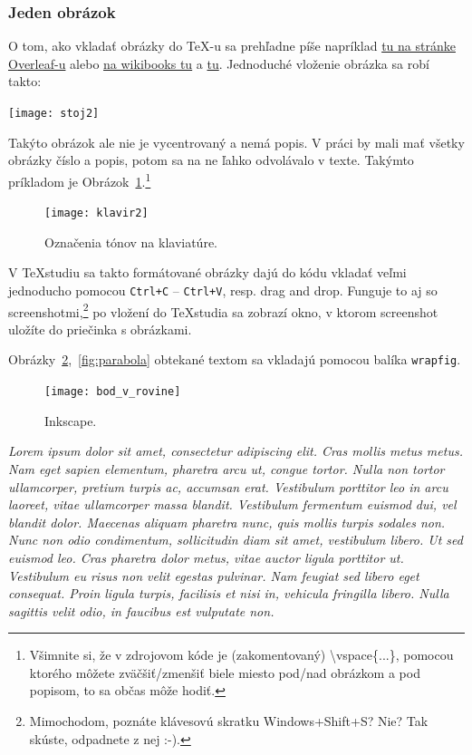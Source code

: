 \subsubsection{Jeden obrázok}
O tom, ako vkladať obrázky do TeX-u sa prehľadne píše napríklad \href{https://www.overleaf.com/learn/latex/Inserting_Images}{tu na stránke Overleaf-u} alebo \href{https://en.wikibooks.org/wiki/LaTeX/Importing_Graphics}{na wikibooks tu} a \href{https://en.wikibooks.org/wiki/LaTeX/Floats,_Figures_and_Captions}{tu}. Jednoduché vloženie obrázka sa robí takto:

\texttt{[image: stoj2]}

Takýto obrázok ale nie je vycentrovaný a nemá popis. V práci by mali mať všetky obrázky číslo a popis, potom sa na ne ľahko odvolávalo v texte. Takýmto príkladom je Obrázok~\ref{fig:klavir}.\footnote{Všimnite si, že v zdrojovom kóde je (zakomentovaný) \textbackslash vspace\{...\}, pomocou ktorého môžete zväčšiť/zmenšiť biele miesto pod/nad obrázkom a pod popisom, to sa občas môže hodiť.}

\begin{figure}[h]
	\centering
	\texttt{[image: klavir2]}
	\caption{Označenia tónov na klaviatúre.}
	\label{fig:klavir}
\end{figure}

V TeXstudiu sa takto formátované obrázky dajú do kódu vkladať veľmi jednoducho pomocou \verb|Ctrl+C| -- \verb|Ctrl+V|, resp. drag and drop. Funguje to aj so screenshotmi,\footnote{Mimochodom, poznáte klávesovú skratku Windows+Shift+S? Nie? Tak skúste, odpadnete z nej :-).} po vložení do TeXstudia sa zobrazí okno, v ktorom screenshot uložíte do priečinka s obrázkami.

Obrázky~\ref{fig:bod_v_rovine},~\ref{fig:parabola} obtekané textom sa vkladajú pomocou balíka \verb|wrapfig|.

\begin{figure}
	\centering
	\texttt{[image: bod\_v\_rovine]}
	\caption{Inkscape.}
	\label{fig:bod_v_rovine}
\end{figure}
\textit{Lorem ipsum dolor sit amet, consectetur adipiscing elit. Cras mollis metus metus. Nam eget sapien elementum, pharetra arcu ut, congue tortor. Nulla non tortor ullamcorper, pretium turpis ac, accumsan erat. Vestibulum porttitor leo in arcu laoreet, vitae ullamcorper massa blandit. Vestibulum fermentum euismod dui, vel blandit dolor. Maecenas aliquam pharetra nunc, quis mollis turpis sodales non. Nunc non odio condimentum, sollicitudin diam sit amet, vestibulum libero. Ut sed euismod leo. Cras pharetra dolor metus, vitae auctor ligula porttitor ut. Vestibulum eu risus non velit egestas pulvinar. Nam feugiat sed libero eget consequat. Proin ligula turpis, facilisis et nisi in, vehicula fringilla libero. Nulla sagittis velit odio, in faucibus est vulputate non.}

